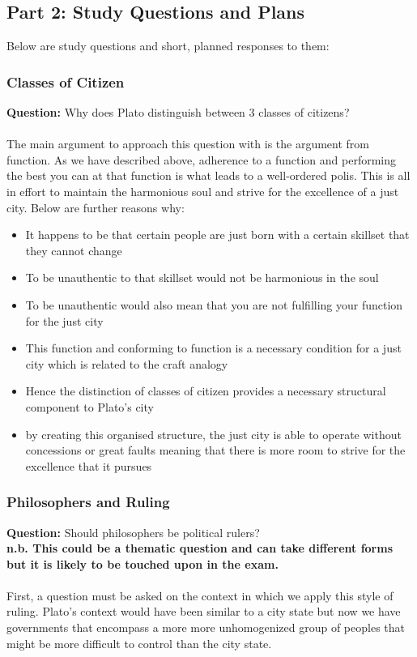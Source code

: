 \documentclass[12pt, letterpaper]{article}
\begin{document}
\subsection{Part 2: Study Questions and Plans}
Below are study questions and short, planned responses to them:

\subsubsection{Classes of Citizen}
\textbf{Question:} Why does Plato distinguish between 3 classes of citizens?\\\\
The main argument to approach this question with is the argument from function. As we have described above, adherence to a function and performing the best you can at that function is what leads to a well-ordered polis. This is all in effort to maintain the harmonious soul and strive for the excellence of a just city. Below are further reasons why:
\begin{itemize}
	\item It happens to be that certain people are just born with a certain skillset that they cannot change
	\item To be unauthentic to that skillset would not be harmonious in the soul
	\item To be unauthentic would also mean that you are not fulfilling your function for the just city
	\item This function and conforming to function is a necessary condition for a just city which is related to the craft analogy
	\item Hence the distinction of classes of citizen provides a necessary structural component to Plato's city
	\item by creating this organised structure, the just city is able to operate without concessions or great faults meaning that there is more room to strive for the excellence that it pursues
\end{itemize}

\subsubsection{Philosophers and Ruling}
\textbf{Question:} Should philosophers be political rulers?\\
\textbf{n.b. This could be a thematic question and can take different forms but it is likely to be touched upon in the exam.}\\\\
First, a question must be asked on the context in which we apply this style of ruling. Plato's context would have been similar to a city state but now we have governments that encompass a more more unhomogenized group of peoples that might be more difficult to control than the city state.
\end{document}
